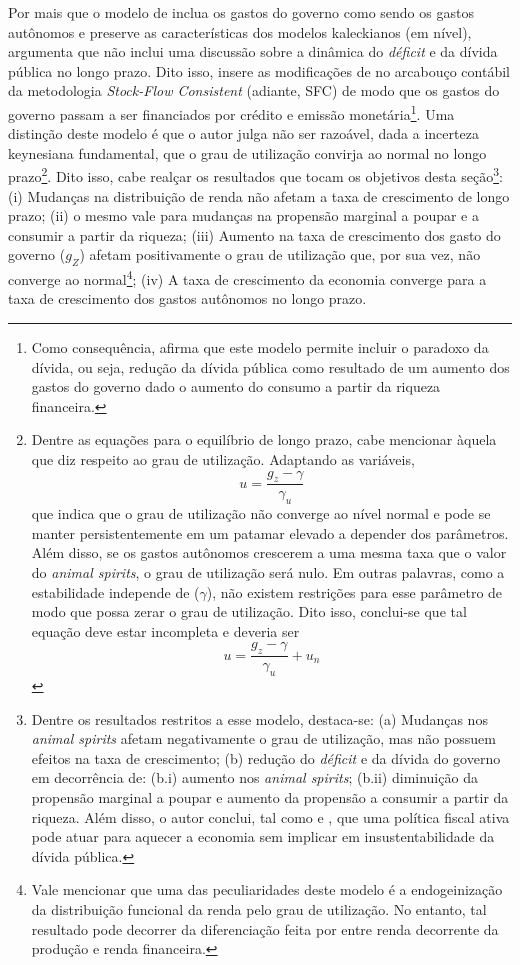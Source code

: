Por mais que o modelo de \textcite{allain_tackling_2015} inclua os gastos do governo como sendo os gastos autônomos e preserve as características dos modelos kaleckianos (em nível), \textcite{hein_autonomous_2018} argumenta que não inclui uma discussão sobre a dinâmica do \textit{déficit} e da dívida pública no longo prazo. 
Dito isso, insere as modificações de \textcite{allain_tackling_2015} no arcabouço contábil da metodologia \textit{Stock-Flow Consistent} (adiante, SFC) de modo que os gastos do governo passam a ser financiados por crédito e emissão monetária\footnote{
	Como consequência, \textcite{hein_autonomous_2018} afirma que este modelo permite incluir o paradoxo da dívida, ou seja, redução da dívida pública como resultado de um aumento dos gastos do governo dado o aumento do consumo a partir da riqueza financeira. 
}. Uma distinção deste modelo é que o autor julga não ser razoável, dada a incerteza keynesiana fundamental, que o grau de utilização convirja ao normal no longo prazo\footnote{
	Dentre as equações para o equilíbrio de longo prazo, cabe mencionar àquela que diz respeito ao grau de utilização. Adaptando as variáveis,
	$$
	u = \frac{g_z - \gamma}{\gamma_u}
	$$
	que indica que o grau de utilização não converge ao nível normal e pode se manter persistentemente em um patamar elevado a depender dos parâmetros. Além disso, se os gastos autônomos crescerem a uma mesma taxa que o valor do \textit{animal spirits}, o grau de utilização será nulo. Em outras palavras, como a estabilidade independe de ($\gamma$), não existem restrições para esse parâmetro de modo que possa zerar o grau de utilização. Dito isso, conclui-se que tal equação deve estar incompleta e deveria ser
	$$
	u = \frac{g_z - \gamma}{\gamma_u} + u_n
	$$
}. 
Dito isso, cabe realçar os resultados que tocam os objetivos desta seção\footnote{
	Dentre os resultados restritos a esse modelo, destaca-se:  
	(a) Mudanças nos \textit{animal spirits} afetam negativamente o grau de utilização, mas não possuem efeitos na taxa de crescimento; 
	(b) redução do \textit{déficit} e da dívida do governo em decorrência de: 
	(b.i) aumento nos \textit{animal spirits}; 
	(b.ii) diminuição da propensão marginal a poupar e aumento da propensão a consumir a partir da riqueza. 
	Além disso, o autor conclui, tal como \textcite[Capítulo 11]{godley_growth_2011} e \textcite{arestis_effectiveness_2012}, que uma política fiscal ativa pode atuar para aquecer a economia sem implicar em insustentabilidade da dívida pública.
}: 
	(i) Mudanças na distribuição de renda não afetam a taxa de crescimento de longo prazo; 
	(ii) o mesmo vale para mudanças na propensão marginal a poupar e a consumir a partir da riqueza; 
	(iii) Aumento na taxa de crescimento dos gasto do governo ($g_Z$) afetam positivamente o grau de utilização que, por sua vez, não converge ao normal\footnote{
		Vale mencionar que uma das peculiaridades deste modelo é a endogeinização da distribuição funcional da renda pelo grau de utilização. No entanto, tal resultado pode decorrer da diferenciação feita por \textcite{hein_autonomous_2018} entre renda decorrente da produção e renda financeira.
		}; 
	(iv) A taxa de crescimento da economia converge para a taxa de crescimento dos gastos autônomos no longo prazo. 

